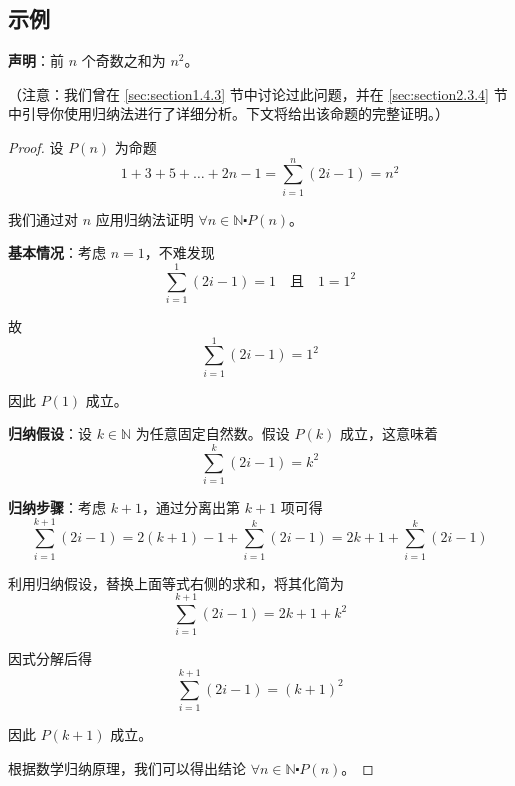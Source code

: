 \subsection{示例}

\begin{example}[奇数之和是平方数]

    \textbf{声明}：前 $n$ 个奇数之和为 $n^2$。

    （注意：我们曾在 \ref{sec:section1.4.3} 节中讨论过此问题，并在 \ref{sec:section2.3.4} 节中引导你使用归纳法进行了详细分析。下文将给出该命题的完整证明。）

    \begin{proof}
        设 $P(n)$ 为命题
        \[1+3+5+ \dots +2n-1 = \sum_{i=1}^n (2i-1) = n^2\]

        我们通过对 $n$ 应用归纳法证明 $\forall n \in \mathbb{N} \centerdot P(n)$。

        \textbf{基本情况}：考虑 $n=1$，不难发现
        \[\sum_{i=1}^1 (2i-1) = 1 \quad \text{且} \quad 1=1^2\]

        故
        \[\sum_{i=1}^1 (2i-1) = 1^2\]

        因此 $P(1)$ 成立。

        \textbf{归纳假设}：设 $k \in \mathbb{N}$ 为任意固定自然数。假设 $P(k)$ 成立，这意味着
        \[\sum_{i=1}^k (2i-1) = k^2\]

        \textbf{归纳步骤}：考虑 $k+1$，通过分离出第 $k+1$ 项可得
        \[\sum_{i=1}^{k+1} (2i-1) = 2(k + 1) - 1 + \sum_{i=1}^k (2i-1) = 2k + 1 + \sum_{i=1}^k (2i-1)\]

        利用归纳假设，替换上面等式右侧的求和，将其化简为
        \[\sum_{i=1}^{k+1} (2i-1) = 2k+1+k^2\]

        因式分解后得
        \[\sum_{i=1}^{k+1} (2i-1) = (k+1)^2\]
        
        因此 $P(k+1)$ 成立。

        根据数学归纳原理，我们可以得出结论 $\forall n \in \mathbb{N} \centerdot P(n)$。
    \end{proof}
\end{example}

